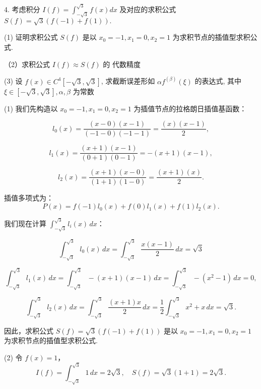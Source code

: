    \begin{tcolorbox}[breakable,enhanced,arc=0mm,outer arc=0mm,
		boxrule=0pt,toprule=1pt,leftrule=0pt,bottomrule=1pt, rightrule=0pt,left=0.2cm,right=0.2cm,
		titlerule=0.5em,toptitle=0.1cm,bottomtitle=-0.1cm,top=0.2cm,
		colframe=white!10!biru,colback=white!90!biru,coltitle=white,
            coltext=black,title =2024-05, title style={white!10!biru}, before skip=8pt, after skip=8pt,before upper=\hspace{2em},
		fonttitle=\bfseries,fontupper=\normalsize]
  
4. 考虑积分 $ I(f)=\displaystyle\int_{-\sqrt{3}}^{\sqrt{3}} f(x) d x $ 及对应的求积公式
$
S(f)=\sqrt{3}(f(-1)+f(1)) .
$

(1) 证明求积公式 $ S(f) $ 是以 $ x_{0}=-1, x_{1}=0, x_{2}=1 $ 为求积节点的插值型求积公式.

（2）求积公式 $ I(f) \approx S(f) $ 的 代数精度

(3) 设 $ f(x) \in C^{4}[-\sqrt{3}, \sqrt{3}] $, 求截断误差形如 $ \alpha f^{(\beta)}(\xi) $ 的表达式, 其中 $ \xi \in[-\sqrt{3}, \sqrt{3}], \alpha, \beta $ 为常数
\tcblower


 (1) 我们先构造以 $x_{0}=-1, x_{1}=0, x_{2}=1$ 为插值节点的拉格朗日插值基函数：

\[
l_{0}(x) = \frac{(x-0)(x-1)}{(-1-0)(-1-1)} = \frac{(x)(x-1)}{2},
\]

\[
l_{1}(x) = \frac{(x+1)(x-1)}{(0+1)(0-1)} = -(x+1)(x-1),
\]

\[
l_{2}(x) = \frac{(x+1)(x-0)}{(1+1)(1-0)} = \frac{(x+1)(x)}{2}.
\]

插值多项式为：
\[
P(x) = f(-1)l_{0}(x) + f(0)l_{1}(x) + f(1)l_{2}(x).
\]

我们现在计算 $\displaystyle\int_{-\sqrt{3}}^{\sqrt{3}} l_{i}(x) \, dx$：

\[
\int_{-\sqrt{3}}^{\sqrt{3}} l_{0}(x) \, dx = \int_{-\sqrt{3}}^{\sqrt{3}} \frac{x(x-1)}{2} \, dx =\sqrt{3}
\]

\[
\int_{-\sqrt{3}}^{\sqrt{3}} l_{1}(x) \, dx = \int_{-\sqrt{3}}^{\sqrt{3}} -(x+1)(x-1) \, dx = \int_{-\sqrt{3}}^{\sqrt{3}} -(x^2-1) \, dx = 0,
\]

\[
\int_{-\sqrt{3}}^{\sqrt{3}} l_{2}(x) \, dx = \int_{-\sqrt{3}}^{\sqrt{3}} \frac{(x+1)x}{2} \, dx = \frac{1}{2} \int_{-\sqrt{3}}^{\sqrt{3}} x^2 + x \, dx = \sqrt{3}.
\]

因此，求积公式 $S(f) = \sqrt{3}(f(-1) + f(1))$ 是以 $x_{0} = -1, x_{1} = 0, x_{2} = 1$ 为求积节点的插值型求积公式.

 (2) 令 $f(x) = 1$，
\[
I(f) = \int_{-\sqrt{3}}^{\sqrt{3}} 1 \, dx = 2\sqrt{3}, \quad S(f) = \sqrt{3}(1 + 1) = 2\sqrt{3}.
\]


\end{tcolorbox}
